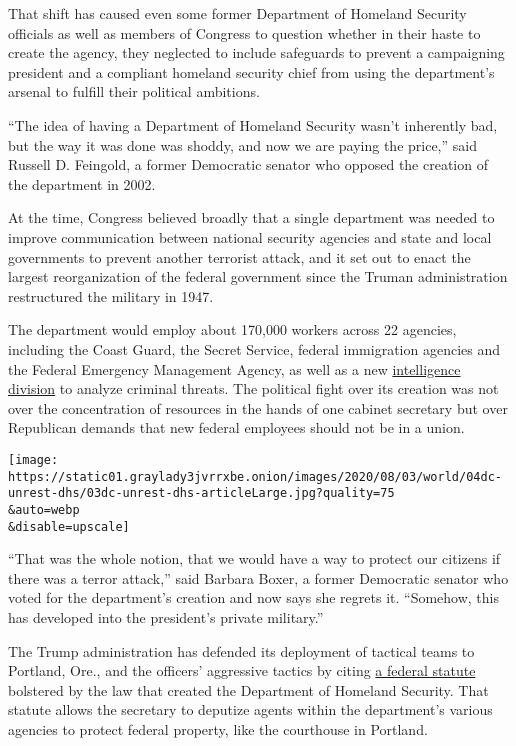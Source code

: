 That shift has caused even some former Department of Homeland Security
officials as well as members of Congress to question whether in their
haste to create the agency, they neglected to include safeguards to
prevent a campaigning president and a compliant homeland security chief
from using the department's arsenal to fulfill their political
ambitions.

``The idea of having a Department of Homeland Security wasn't inherently
bad, but the way it was done was shoddy, and now we are paying the
price,'' said Russell D. Feingold, a former Democratic senator who
opposed the creation of the department in 2002.

At the time, Congress believed broadly that a single department was
needed to improve communication between national security agencies and
state and local governments to prevent another terrorist attack, and it
set out to enact the largest reorganization of the federal government
since the Truman administration restructured the military in 1947.

The department would employ about 170,000 workers across 22 agencies,
including the Coast Guard, the Secret Service, federal immigration
agencies and the Federal Emergency Management Agency, as well as a new
\href{https://www.nytimes3xbfgragh.onion/2020/08/01/us/politics/brian-murphy-homeland-security-protesters.html}{intelligence
division} to analyze criminal threats. The political fight over its
creation was not over the concentration of resources in the hands of one
cabinet secretary but over Republican demands that new federal employees
should not be in a union.

\texttt{[image: https://static01.graylady3jvrrxbe.onion/images/2020/08/03/world/04dc-unrest-dhs/03dc-unrest-dhs-articleLarge.jpg?quality=75\\\&auto=webp\\\&disable=upscale]}

``That was the whole notion, that we would have a way to protect our
citizens if there was a terror attack,'' said Barbara Boxer, a former
Democratic senator who voted for the department's creation and now says
she regrets it. ``Somehow, this has developed into the president's
private military.''

The Trump administration has defended its deployment of tactical teams
to Portland, Ore., and the officers' aggressive tactics by citing
\href{https://www.law.cornell.edu/uscode/text/40/1315}{a federal
statute} bolstered by the law that created the Department of Homeland
Security. That statute allows the secretary to deputize agents within
the department's various agencies to protect federal property, like the
courthouse in Portland.

